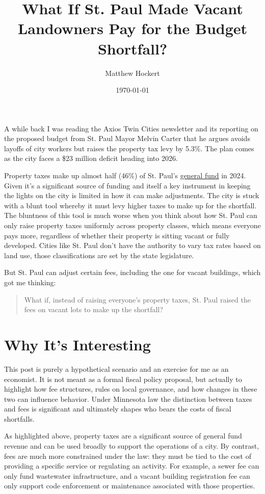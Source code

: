 \documentclass[12pt]{article}
\title{What If St. Paul Made Vacant Landowners Pay for the Budget Shortfall?}
\author{Matthew Hockert}
\date{\today}
\begin{document}
\maketitle

A while back I was reading the Axios Twin Cities newsletter and its reporting on the proposed budget from St. Paul Mayor Melvin Carter that he argues avoids layoffs of city workers but raises the property tax levy by 5.3\%. The plan comes as the city faces a \$23 million deficit heading into 2026.  

Property taxes make up almost half (46\%) of St. Paul's \href{https://www.stpaul.gov/sites/default/files/2024-02/2024%20City%20of%20Saint%20Paul%20Adopted%20Operating%20Budget.pdf}{general fund} in 2024. Given it's a significant source of funding and itself a key instrument in keeping the lights on the city is limited in how it can make adjustments. The city is stuck with a blunt tool whereby it must levy higher taxes to make up for the shortfall. The bluntness of this tool is much worse when you think about how St. Paul can only raise property taxes uniformly across property classes, which means everyone pays more, regardless of whether their property is sitting vacant or fully developed. Cities like St. Paul don’t have the authority to vary tax rates based on land use, those classifications are set by the state legislature.  

But St. Paul can adjust certain fees, including the one for vacant buildings, which got me thinking:  

\begin{quote}
What if, instead of raising everyone’s property taxes, St. Paul raised the fees on vacant lots to make up the shortfall?
\end{quote}

\section*{Why It’s Interesting}

This post is purely a hypothetical scenario and an exercise for me as an economist. It is not meant as a formal fiscal policy proposal, but actually to highlight how fee structures, rules on local governance, and how changes in these two can influence behavior. Under Minnesota law the distinction between taxes and fees is significant and ultimately shapes who bears the costs of fiscal shortfalls.

As highlighted above, property taxes are a significant source of general fund revenue and can be used broadly to support the operations of a city. By contrast, fees are much more constrained under the law: they must be tied to the cost of providing a specific service or regulating an activity. For example, a sewer fee can only fund wastewater infrastructure, and a vacant building registration fee can only support code enforcement or maintenance associated with those properties.
\end{document}
